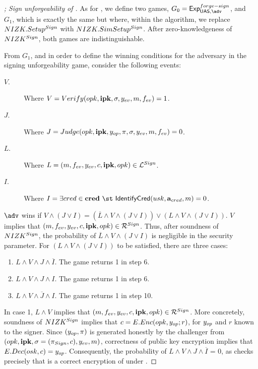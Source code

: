 \begin{proof}[; Sign unforgeability of \CUASGen]
  As for , we define two games, $G_0=\ExpForgeSign$,
  and $G_1$, which is exactly the same but where, within the \Setup algorithm,
  we replace $NIZK.Setup^{Sign}$ with $NIZK.SimSetup^{Sign}$. After
  zero-knowledgeness of $NIZK^{Sign}$, both games are indistinguishable.

  From $G_1$, and in order to define the winning conditions for the adversary
  in the signing unforgeability game, consider the following events:

  \begin{description}
  \item[$V$.] Where $V = Verify(opk,\mathbf{ipk},\sigma,y_{ev},m,f_{ev}) = 1$.
  \item[$J$.] Where $J = Judge(opk,\mathbf{ipk},y_{op},\pi,\sigma,y_{ev},m,
    f_{ev}) = 0$.
  \item[$L$.] Where $L = (m,f_{ev},y_{ev},c,\mathbf{ipk},opk) \in
    \mathcal{L}^{Sign}$.    
  \item[$I$.] Where $I = \exists \cred \in \scred~\st~\IdentifyCred(\usk,
    \attrs_{\cred},\msg) = 0$.
  \end{description}

  $\adv$ wins if $V \land (J \lor I) = (\overline{L} \land V \land (J \lor I))
  \lor (L \land V \land (J \lor I))$.
  $V$ implies that $(m,f_{ev},y_{ev},c,\mathbf{ipk},opk) \in \mathcal{R}^{Sign}$.
  Thus, after soundness of $NIZK^{Sign}$, the probability of $\overline{L}
  \land V \land (J \lor I)$ is negligible in the security parameter.
  For $(L \land V \land (J \lor I))$ to be satisfied, there are three cases:
  \begin{enumerate}
  \item $L \land V \land J \land \overline{I}$. The game returns 1 in step 6.
  \item $L \land V \land J \land I$.  The game returns 1 in step 6.
  \item $L \land V \land \overline{J} \land I$. The game returns 1 in step 10. 
  \end{enumerate}

  In case 1, $L \land V$ implies that $(m,f_{ev},y_{ev},c,\mathbf{ipk},opk) \in
  \mathcal{R}^{Sign}$. More concretely, soundness of $NIZK^{Sign}$ implies that
  $c = E.Enc(opk,y_{op};r)$, for $y_{op}$ and $r$ known to the signer. Since
  $(y_{op},\pi)$ is generated honestly by the challenger from
  $(opk,\mathbf{ipk},\sigma = (\pi_{Sign},c),y_{ev},m)$, correctness of
  public key encryption implies that $E.Dec(osk,c) = y_{op}$. Consequently,
  the probability of $L \land V \land J \land \overline{I}$ = 0, as \Judge
  checks precisely that \Ec is a correct encryption of \yinsp under \opk.


\end{proof}
